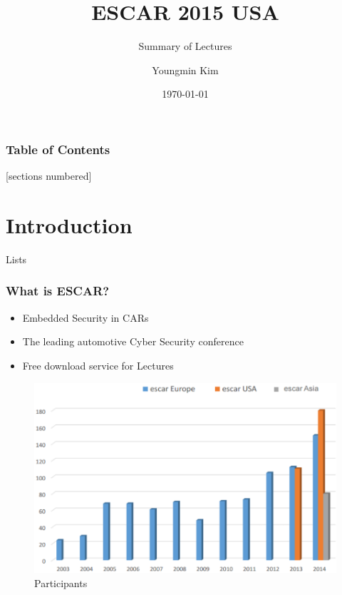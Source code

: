 \documentclass[10pt,aspectratio=169]{beamer}
\title{ESCAR 2015 USA}
\subtitle{Summary of Lectures}
\date{\today}
\author{Youngmin Kim}
\institute{Queensland University of Technology}
\begin{document}
\maketitle

\begin{frame}
  \frametitle{Table of Contents}
  [sections numbered]
  \tableofcontents[hideallsubsections]
\end{frame}

\section{Introduction}

\begin{frame}{Lists}
  \frametitle{What is ESCAR?}

  \begin{itemize}
      \item Embedded Security in CARs
      \item The leading automotive Cyber Security conference
      \item Free download service for Lectures
  \end{itemize}    
  \begin{figure}
      \centering
      \includegraphics[trim={0 0 0 0},clip,scale=0.2]{img/participants.png} \caption{Participants}
  \end{figure}
\end{frame}
\end{document}
